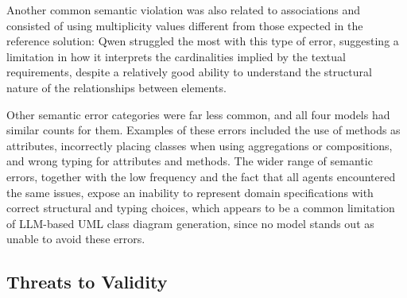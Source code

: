 Another common semantic violation was also related to associations and consisted of using multiplicity values different from those expected in the reference solution: Qwen struggled the most with this type of error, suggesting a limitation in how it interprets the cardinalities implied by the textual requirements, despite a relatively good ability to understand the structural nature of the relationships between elements.

Other semantic error categories were far less common, and all four models had similar counts for them. Examples of these errors included the use of methods as attributes, incorrectly placing classes when using aggregations or compositions, and wrong typing for attributes and methods. The wider range of semantic errors, together with the low frequency and the fact that all agents encountered the same issues, expose an inability to represent domain specifications with correct structural and typing choices, which appears to be a common limitation of LLM-based UML class diagram generation, since no model stands out as unable to avoid these errors.



\subsection{Threats to Validity}

